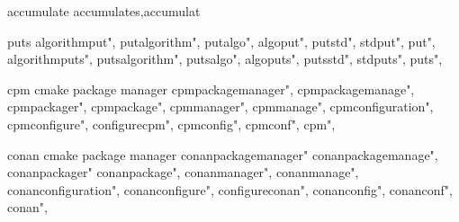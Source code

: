          accumulate
        accumulates,accumulat
        
         puts 
        algorithmput",  
        putalgorithm",  
        putalgo",  
        algoput",  
        putstd",  
        stdput",  
        put",  
        algorithmputs",  
        putsalgorithm",  
        putsalgo",  
        algoputs",  
        putsstd",  
        stdputs",  
        puts",  
        
         cpm cmake package manager
        cpmpackagemanager",  
        cpmpackagemanage",  
        cpmpackager",  
        cpmpackage",  
        cpmmanager",  
        cpmmanage",  
        cpmconfiguration",  
        cpmconfigure",  
        configurecpm",  
        cpmconfig",  
        cpmconf",  
        cpm",  
        
         
         conan cmake package manager
        conanpackagemanager" 
        conanpackagemanage",
        conanpackager"
        conanpackage", 
        conanmanager", 
        conanmanage",
        conanconfiguration",
        conanconfigure",
        configureconan",
        conanconfig",
        conanconf",
        conan",
